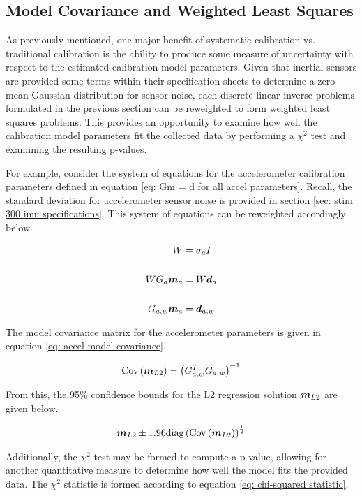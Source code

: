 \subsection{Model Covariance and Weighted Least Squares}

As previously mentioned, one major benefit of systematic calibration vs. traditional calibration is the ability to produce some measure of uncertainty with respect to the estimated calibration model parameters. Given that inertial sensors are provided some terms within their specification sheets to determine a zero-mean Gaussian distribution for sensor noise, each discrete linear inverse problems formulated in the previous section can be reweighted to form weighted least squares problems. This provides an opportunity to examine how well the calibration model parameters fit the collected data by performing a $\chi^2$ test and examining the resulting p-values.

For example, consider the system of equations for the accelerometer calibration parameters defined in equation \ref{eq: Gm = d for all accel parameters}. Recall, the standard deviation for accelerometer sensor noise is provided in section \ref{sec: stim 300 imu specifications}. This system of equations can be reweighted accordingly below.

\begin{align}
	W &= \sigma_a I \notag \notag\\
	\notag\\
	W G_a \boldsymbol{m}_a &= W \boldsymbol{d}_a \\
	\notag\\
	G_{a,w} \boldsymbol{m}_a &= \boldsymbol{d}_{a,w} \notag
\end{align}

The model covariance matrix for the accelerometer parameters is given in equation \ref{eq: accel model covariance}.

\begin{align} \label{eq: accel model covariance}
	\textrm{Cov}\left(\boldsymbol{m}_{L2}\right) = \left(G_{a,w}^T G_{a,w}\right)^{-1}
\end{align}

From this, the 95\% confidence bounds for the L2 regression solution $\boldsymbol{m}_{L2}$ are given below.

\begin{align}
	\boldsymbol{m}_{L2} \pm 1.96 \textrm{diag}\left(\textrm{Cov}\left(\boldsymbol{m}_{L2}\right)\right)^{\frac{1}{2}}
\end{align}

Additionally, the $\chi^2$ test may be formed to compute a p-value, allowing for another quantitative measure to determine how well the model fits the provided data. The $\chi^2$ statistic is formed according to equation \ref{eq: chi-squared statistic}. 

